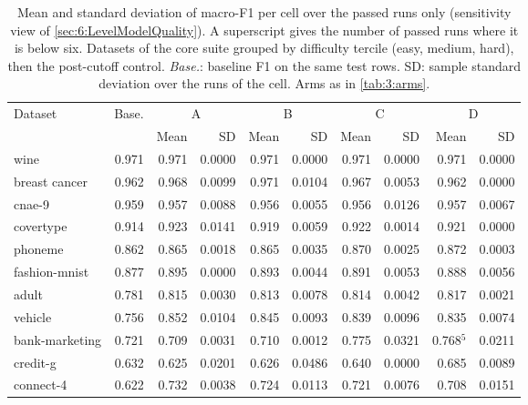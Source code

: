 \begin{table}[htbp]
  \centering
  \small
  \caption[Mean and SD of F1 per cell, passed runs only]{Mean and standard deviation of macro-F1 per cell over the passed runs only (sensitivity view of \autoref{sec:6:LevelModelQuality}). A superscript gives the number of passed runs where it is below six. Datasets of the core suite grouped by difficulty tercile (easy, medium, hard), then the post-cutoff control. \emph{Base.}: baseline F1 on the same test rows. SD: sample standard deviation over the runs of the cell. Arms as in \autoref{tab:3:arms}.}
  \label{tab:D:passed}
  \begin{tabular}{lrrrrrrrrr}
    \toprule
    Dataset & Base. & \multicolumn{2}{c}{A} & \multicolumn{2}{c}{B} & \multicolumn{2}{c}{C} & \multicolumn{2}{c}{D} \\
    \cmidrule(lr){3-4}\cmidrule(lr){5-6}\cmidrule(lr){7-8}\cmidrule(lr){9-10}
     & & Mean & SD & Mean & SD & Mean & SD & Mean & SD \\
    \midrule
    wine & 0.971 & 0.971 & 0.0000 & 0.971 & 0.0000 & 0.971 & 0.0000 & 0.971 & 0.0000 \\
    breast cancer & 0.962 & 0.968 & 0.0099 & 0.971 & 0.0104 & 0.967 & 0.0053 & 0.962 & 0.0000 \\
    cnae-9 & 0.959 & 0.957 & 0.0088 & 0.956 & 0.0055 & 0.956 & 0.0126 & 0.957 & 0.0067 \\
    covertype & 0.914 & 0.923 & 0.0141 & 0.919 & 0.0059 & 0.922 & 0.0014 & 0.921 & 0.0000 \\
    \addlinespace
    phoneme & 0.862 & 0.865 & 0.0018 & 0.865 & 0.0035 & 0.870 & 0.0025 & 0.872 & 0.0003 \\
    fashion-mnist & 0.877 & 0.895 & 0.0000 & 0.893 & 0.0044 & 0.891 & 0.0053 & 0.888 & 0.0056 \\
    adult & 0.781 & 0.815 & 0.0030 & 0.813 & 0.0078 & 0.814 & 0.0042 & 0.817 & 0.0021 \\
    vehicle & 0.756 & 0.852 & 0.0104 & 0.845 & 0.0093 & 0.839 & 0.0096 & 0.835 & 0.0074 \\
    \addlinespace
    bank-marketing & 0.721 & 0.709 & 0.0031 & 0.710 & 0.0012 & 0.775 & 0.0321 & 0.768$^{5}$ & 0.0211 \\
    credit-g & 0.632 & 0.625 & 0.0201 & 0.626 & 0.0486 & 0.640 & 0.0000 & 0.685 & 0.0089 \\
    connect-4 & 0.622 & 0.732 & 0.0038 & 0.724 & 0.0113 & 0.721 & 0.0076 & 0.708 & 0.0151 \\

\end{tabular}
\end{table}
